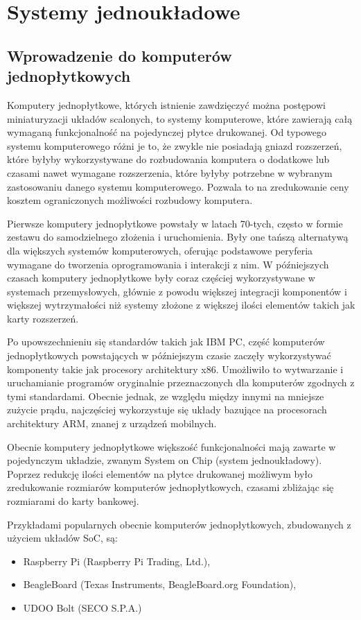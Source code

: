 \section{Systemy jednoukładowe}

\subsection{Wprowadzenie do komputerów jednopłytkowych}

Komputery jednopłytkowe, których istnienie zawdzięczyć można postępowi miniaturyzacji układów scalonych, to systemy komputerowe, które zawierają całą wymaganą funkcjonalność na pojedynczej płytce drukowanej. Od typowego systemu komputerowego różni je to, że zwykle nie posiadają gniazd rozszerzeń, które byłyby wykorzystywane do rozbudowania komputera o dodatkowe lub czasami nawet wymagane rozszerzenia, które byłyby potrzebne w wybranym zastosowaniu danego systemu komputerowego. Pozwala to na zredukowanie ceny kosztem ograniczonych możliwości rozbudowy komputera.

Pierwsze komputery jednopłytkowe powstały w latach 70-tych\cite{Ariza_2021}, często w formie zestawu do samodzielnego złożenia i uruchomienia. Były one tańszą alternatywą dla większych systemów komputerowych, oferując podstawowe peryferia wymagane do tworzenia oprogramowania i interakcji z nim.
W późniejszych czasach komputery jednopłytkowe były coraz częściej wykorzystywane w systemach przemysłowych, głównie z powodu większej integracji komponentów i większej wytrzymałości niż systemy złożone z większej ilości elementów takich jak karty rozszerzeń.

Po upowszechnieniu się standardów takich jak IBM PC\cite{ibmpc1981}, część komputerów jednopłytkowych powstających w późniejszym czasie zaczęły wykorzystywać komponenty takie jak procesory architektury x86. Umożliwiło to wytwarzanie i uruchamianie programów oryginalnie przeznaczonych dla komputerów zgodnych z tymi standardami. Obecnie jednak, ze względu między innymi na mniejsze zużycie prądu, najczęściej wykorzystuje się układy bazujące na procesorach architektury ARM, znanej z urządzeń mobilnych.

Obecnie komputery jednopłytkowe większość funkcjonalności mają zawarte w pojedynczym układzie, zwanym System on Chip (system jednoukładowy). Poprzez redukcję ilości elementów na płytce drukowanej możliwym było zredukowanie rozmiarów komputerów jednopłytkowych, czasami zbliżając się rozmiarami do karty bankowej.

Przykładami popularnych obecnie komputerów jednopłytkowych, zbudowanych z użyciem układów SoC, są:
\begin{itemize}
	\item Raspberry Pi\cite{rpi1bplus} (Raspberry Pi Trading, Ltd.),
	\item BeagleBoard\cite{beagleboard} (Texas Instruments, BeagleBoard.org Foundation),
	\item UDOO Bolt\cite{udoobolt} (SECO S.P.A.)
\end{itemize}

